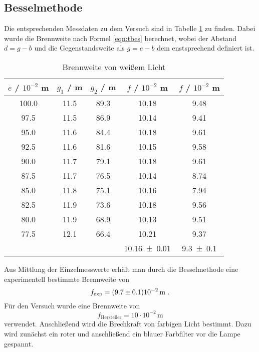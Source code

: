 \subsection{Besselmethode}
Die entsprechenden Messdaten zu dem Versuch sind in Tabelle \ref{tab:ffw} zu finden.  Dabei wurde die Brennweite nach Formel \ref{eqn:tbes} berechnet, wobei der Abstand $d = g - b$ und die Gegenstandsweite als $g = e - b$ dem enstsprechend definiert ist.
\begin{table}
  \centering
  \begin{tabular}{c c c | c c}
    \toprule
    $e$ / $10^{-2}$ m & $g_1$ / m & $g_2$ / m & $f$ / $10^{-2}$ m & $f$ / $10^{-2}$ m\\
    \midrule
	100.0	& 11.5	& 89.3	& 10.18	& 9.48	\\
	97.5	& 11.5	& 86.9	& 10.14	& 9.41	\\
	95.0	& 11.6	& 84.4	& 10.18	& 9.61	\\
	92.5	& 11.6	& 81.6	& 10.15	& 9.58	\\
	90.0	& 11.7	& 79.1	& 10.18	& 9.61	\\
	87.5	& 11.7	& 76.5	& 10.14	& 8.74	\\	
	85.0	& 11.8	& 75.1	& 10.16	& 7.94	\\	
	82.5	& 11.9	& 73.6	& 10.18	& 9.56	\\
	80.0	& 11.9	& 68.9	& 10.13	& 9.51	\\
	77.5	& 12.1	& 66.4	& 10.21	& 9.37	\\
   \midrule
		&	&	& \num{10.16 +- 0.01} & \num{9.3 +- 0.1} \\
   \bottomrule
  \end{tabular}
  	\caption{Brennweite von weißem Licht}
  \label{tab:ffw}
\end{table}
Aus Mittlung der Einzelmesswerte erhält man durch die Besselmethode eine experimentell bestimmte Brennweite von 
\begin{equation}
  f_\text{exp} = (\num{9.7 +- 0.1}) 10^{-2} \, \text{m} \ .
  \label{eqn:fexp}
\end{equation}
Für den Versuch wurde eine Brennweite von 
\begin{equation}
  f_\text{Hersteller} = 10 \cdot 10^{-2} \, \text{m}
  \label{eqn:fHer}
\end{equation}
verwendet.
Anschließend wird die Brechkraft von farbigen Licht bestimmt. Dazu wird zunächst ein roter und anschließend ein blauer Farbfilter vor die Lampe gespannt.
